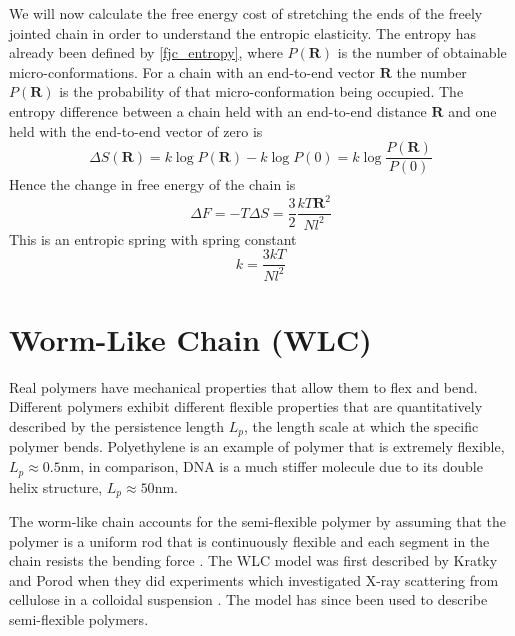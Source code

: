 We will now calculate the free energy cost of stretching the ends of the freely jointed chain in order to understand the entropic elasticity. The entropy has already been defined by \eqref{fjc_entropy}, where $P(\mathbf{R})$ is the number of obtainable micro-conformations. For a chain with an end-to-end vector $\mathbf{R}$ the number $P(\mathbf{R})$ is the probability of that micro-conformation being occupied. The entropy difference between a chain held with an end-to-end distance $\mathbf{R}$ and one held with the end-to-end vector of zero is
%
\begin{equation}
\Delta S(\mathbf{R})=k\log P(\mathbf{R}) - k\log P(0)= k \log \frac{P(\mathbf{R})}{P(0)} 
\end{equation}
%
Hence the change in free energy of the chain is 
%
\begin{equation}\label{fjc_es}
\Delta F=-T\Delta S=\frac{3}{2}\frac{kT\mathbf{R}^{2}}{Nl^{2}}
\end{equation}
%
This is an entropic spring with spring constant
%
\begin{equation}\label{es_const}
k=\frac{3kT}{Nl^{2}}
\end{equation}
%


\section{Worm-Like Chain (WLC)}

Real polymers have mechanical properties that allow them to flex and bend. Different polymers exhibit different flexible properties that are quantitatively described by the persistence length $L_{p}$, the length scale at which the specific polymer bends. Polyethylene is an example of polymer that is extremely flexible, $L_{p} \approx 0.5\text{nm}$, in comparison, DNA is a much stiffer molecule due to its double helix structure, $L_{p} \approx 50\text{nm}$. 

The worm-like chain accounts for the semi-flexible polymer by assuming that the polymer is a uniform rod that is continuously flexible and each segment in the chain resists the bending force \cite{Chan2010}. The WLC model was first described by Kratky and Porod when they did experiments which investigated X-ray scattering from cellulose in a colloidal suspension \cite{Kratky1949}. The model has since been used to describe semi-flexible polymers.

